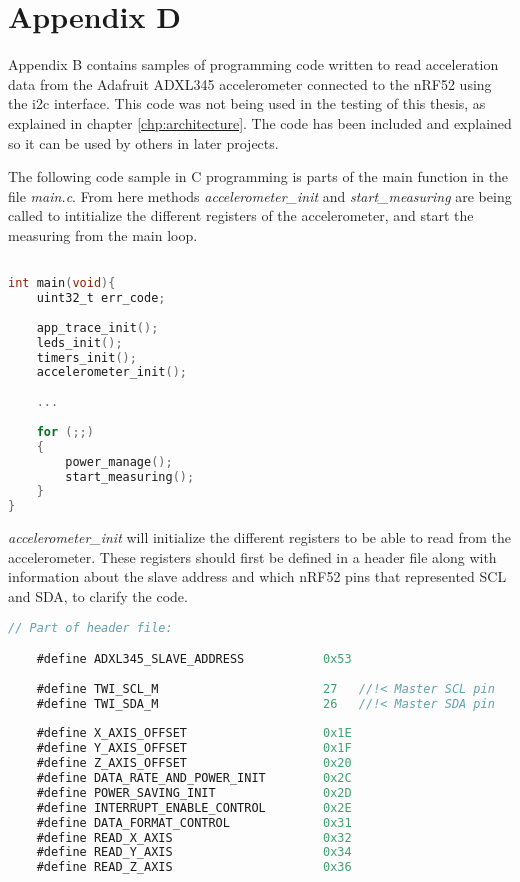 \chapter{Appendix D}
\label{chp:appendixc}

Appendix B contains samples of programming code written to read acceleration data from the Adafruit ADXL345 accelerometer connected to the nRF52 using the \gls{i2c} interface. This code was not being used in the testing of this thesis, as explained in chapter \ref{chp:architecture}. The code has been included and explained so it can be used by others in later projects.

The following code sample in C programming is parts of the main function in the file \textit{main.c}. From here methods \textit{accelerometer\_init} and \textit{start\_measuring} are being called to intitialize the different registers of the accelerometer, and start the measuring from the main loop. 

\begin{lstlisting}[language=C]

int main(void){
	uint32_t err_code; 
	
	app_trace_init(); 
	leds_init(); 
	timers_init();
	accelerometer_init(); 
	
	...
	
	for (;;)
	{
		power_manage();
		start_measuring();
	}
}
\end{lstlisting}

\newpage

\textit{accelerometer\_init} will initialize the different registers to be able to read from the accelerometer. These registers should first be defined in a header file along with information about the slave address and which \gls{nRF52} pins that represented SCL and SDA, to clarify the code. 

\begin{lstlisting}[language=C]
// Part of header file: 

	#define ADXL345_SLAVE_ADDRESS			0x53
		
    #define TWI_SCL_M						27   //!< Master SCL pin
    #define TWI_SDA_M						26   //!< Master SDA pin
		
	#define X_AXIS_OFFSET					0x1E
	#define Y_AXIS_OFFSET					0x1F
	#define Z_AXIS_OFFSET					0x20
	#define DATA_RATE_AND_POWER_INIT		0x2C
	#define POWER_SAVING_INIT				0x2D
	#define INTERRUPT_ENABLE_CONTROL		0x2E
	#define DATA_FORMAT_CONTROL				0x31
	#define READ_X_AXIS						0x32
	#define READ_Y_AXIS						0x34
	#define READ_Z_AXIS						0x36
\end{lstlisting}

